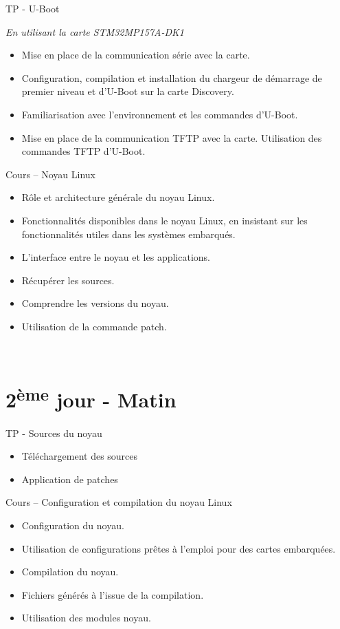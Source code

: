 \documentclass[a4paper,12pt,obeyspaces,spaces,hyphens]{article}
\begin{document}
\feagendatwocolumn
{TP - U-Boot}
{
  {\em En utilisant la carte STM32MP157A-DK1}
  \begin{itemize}
  \item Mise en place de la communication série avec la carte.
  \item Configuration, compilation et installation du chargeur de
	démarrage de premier niveau et d'U-Boot sur la carte Discovery.
  \item Familiarisation avec l'environnement et les commandes d'U-Boot.
  \item Mise en place de la communication TFTP avec la carte.
	Utilisation des commandes TFTP d'U-Boot.
  \end{itemize}
}
{Cours – Noyau Linux}
{
  \begin{itemize}
  \item Rôle et architecture générale du noyau Linux.
  \item Fonctionnalités disponibles dans le noyau Linux, en insistant
	sur les fonctionnalités utiles dans les systèmes embarqués.
  \item L'interface entre le noyau et les applications.
  \item Récupérer les sources.
  \item Comprendre les versions du noyau.
  \item Utilisation de la commande patch.
  \end{itemize}
}
\\

\section{2\textsuperscript{ème} jour - Matin}

\feagendatwocolumn
{TP - Sources du noyau}
{
  \begin{itemize}
  \item Téléchargement des sources
  \item Application de patches
  \end{itemize}
}
{Cours – Configuration et compilation du noyau Linux}
{
  \begin{itemize}
  \item Configuration du noyau.
  \item Utilisation de configurations prêtes à l'emploi pour des cartes embarquées.
  \item Compilation du noyau.
  \item Fichiers générés à l'issue de la compilation.
  \item Utilisation des modules noyau.
  \end{itemize}
}
\end{document}
